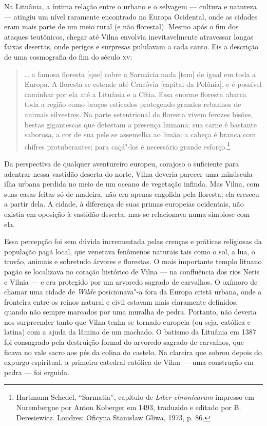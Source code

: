 %

Na Lituânia, a íntima relação entre o urbano e o selvagem --- cultura e
natureza --- atingiu um nível raramente encontrado na Europa Ocidental,
onde as cidades eram mais parte de um meio rural (e não florestal).
Mesmo após o fim dos ataques teutônicos, chegar até Vilna envolvia
inevitavelmente atravessar longas faixas desertas, onde perigos e
surpresas pululavam a cada canto. Eis a descrição de uma cosmografia do
fim do século \textsc{xv}:

\begin{quote}
\ldots{} a famosa floresta {[}que{]} cobre a Sarmácia nada {[}tem{]} de igual
em toda a Europa. A floresta se estende até Cracóvia {[}capital da
Polônia{]}, e é possível caminhar por ela até a Lituânia e a Cítia. Essa
enorme floresta abarca toda a região como braços esticados protegendo
grandes rebanhos de animais silvestres. Na parte setentrional da
floresta vivem ferozes bisões, bestas gigantescas que detestam a
presença humana; sua carne é bastante saborosa, a cor de sua pele se
assemelha ao limão; a cabeça é branca com chifres protuberantes; para
caçá"-los é necessário grande esforço.\footnote{Hartmann Schedel, ``Sarmatia'', capítulo de \textit{Liber chronicarum} impresso em Nurembergue por Anton Koberger em 1493, traduzido e editado por B. Deresiewicz. Londres: Oficyna Stanisław Gliwa, 1973, p. 86.} 
\end{quote}

Da perspectiva de qualquer aventureiro europeu, corajoso o suficiente
para adentrar nessa vastidão deserta do norte, Vilna deveria parecer uma
minúscula ilha urbana perdida no meio de um oceano de vegetação infinda.
Mas Vilna, com suas casas feitas só de madeira, não era apenas engolida
pela floresta; ela cresceu a partir dela. A cidade, à diferença de suas
primas europeias ocidentais, não existia em oposição à vastidão deserta,
mas se relacionava numa simbiose com ela.

Essa percepção foi sem dúvida incrementada pelas crenças e práticas
religiosas da população pagã local, que venerava fenômenos naturais tais
como o sol, a lua, o trovão, animais e sobretudo árvores e florestas. O
mais importante templo lituano pagão se localizava no coração histórico
de Vilna --- na confluência dos rios Neris e Vilnia --- e era protegido por
um arvoredo sagrado de carvalhos. O oxímoro de chamar uma cidade de
\textit{Wilde} posicionava"-a fora da Europa cristã urbana, onde a
fronteira entre os reinos natural e civil estavam mais claramente
definidos, quando não sempre marcados por uma muralha de pedra.
Portanto, não deveria nos surpreender tanto que Vilna tenha se tornado
europeia (ou seja, católica e latina) com a ajuda da lâmina de um
machado. O batismo da Lituânia em 1387 foi consagrado pela destruição
formal do arvoredo sagrado de carvalhos, que ficava no vale sacro aos
pés da colina do castelo. Na clareira que sobrou depois do expurgo
espiritual, a primeira catedral católica de Vilna --- uma construção em
pedra --- foi erguida.

